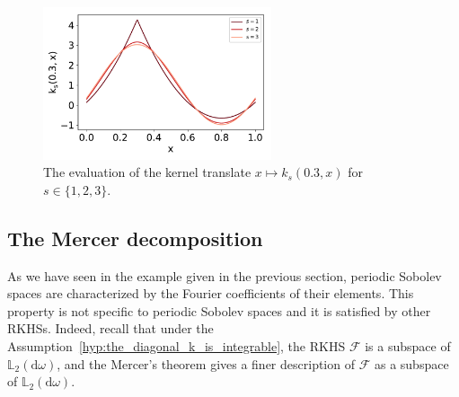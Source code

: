 \documentclass[twoside,11pt]{book}
\numberwithin{theorem}{chapter}
\numberwithin{definition}{chapter}
\numberwithin{proposition}{chapter}
\numberwithin{corollary}{chapter}
\numberwithin{example}{chapter}
\numberwithin{lemma}{chapter}
\numberwithin{assumption}{chapter}
\DeclareMathOperator{\Span}{\mathrm{Span}}
\begin{document}
\begin{figure}[]
    \centering
\includegraphics[width= 0.6\textwidth]{img/Sobolev/Bernoulli_kernels_same_node_s_1_3.pdf}
\caption{The evaluation of the kernel translate $x \mapsto k_{s}(0.3,x)$ for $s \in \{1,2,3\}$.
\label{fig:periodic_sobolev_kernel}}
\end{figure}




%
 


\subsection{The Mercer decomposition}
\label{subsec:mercer}
As we have seen in the example given in the previous section, periodic Sobolev spaces are characterized by the Fourier coefficients of their elements. This property is not specific to periodic Sobolev spaces and it is satisfied by other RKHSs. Indeed, recall that under the Assumption~\ref{hyp:the_diagonal_k_is_integrable}, the RKHS $\mathcal{F}$ is a subspace of $\mathbb{L}_{2}(\mathrm{d}\omega)$, and the Mercer's theorem gives a finer description of $\mathcal{F}$ as a subspace of $\mathbb{L}_{2}(\mathrm{d}\omega)$.
\end{document}
